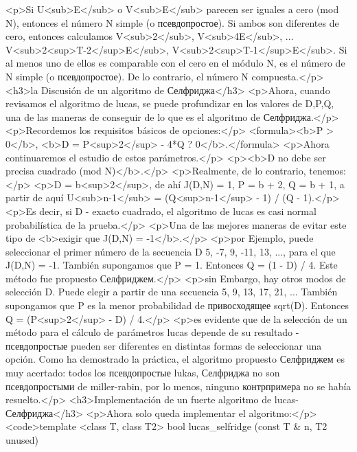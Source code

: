 <p>Si U<sub>E</sub> o V<sub>E</sub> parecen ser iguales a cero (mod N), entonces el número N simple (o псевдопростое). Si ambos son diferentes de cero, entonces calculamos V<sub>2</sub>, V<sub>4E</sub>, ... V<sub>2<sup>T-2</sup>E</sub>, V<sub>2<sup>T-1</sup>E</sub>. Si al menos uno de ellos es comparable con el cero en el módulo N, es el número de N simple (o псевдопростое). De lo contrario, el número N compuesta.</p>
<h3>la Discusión de un algoritmo de Селфриджа</h3>
<p>Ahora, cuando revisamos el algoritmo de lucas, se puede profundizar en los valores de D,P,Q, una de las maneras de conseguir de lo que es el algoritmo de Селфриджа.</p>
<p>Recordemos los requisitos básicos de opciones:</p>
<formula><b>P > 0</b>,
<b>D = P<sup>2</sup> - 4*Q ? 0</b>.</formula>
<p>Ahora continuaremos el estudio de estos parámetros.</p>
<p><b>D no debe ser precisa cuadrado (mod N)</b>.</p>
<p>Realmente, de lo contrario, tenemos:</p>
<p>D = b<sup>2</sup>, de ahí J(D,N) = 1, P = b + 2, Q = b + 1, a partir de aquí U<sub>n-1</sub> = (Q<sup>n-1</sup> - 1) / (Q - 1).</p>
<p>Es decir, si D - exacto cuadrado, el algoritmo de lucas es casi normal probabilística de la prueba.</p>
<p>Una de las mejores maneras de evitar este tipo de <b>exigir que J(D,N) = -1</b>.</p>
<p>por Ejemplo, puede seleccionar el primer número de la secuencia D 5, -7, 9, -11, 13, ..., para el que J(D,N) = -1. También supongamos que P = 1. Entonces Q = (1 - D) / 4. Este método fue propuesto Селфриджем.</p>
<p>sin Embargo, hay otros modos de selección D. Puede elegir a partir de una secuencia 5, 9, 13, 17, 21, ... También supongamos que P es la menor probabilidad de привосходящее sqrt(D). Entonces Q = (P<sup>2</sup> - D) / 4.</p>
<p>es evidente que de la selección de un método para el cálculo de parámetros lucas depende de su resultado - псевдопростые pueden ser diferentes en distintas formas de seleccionar una opción. Como ha demostrado la práctica, el algoritmo propuesto Селфриджем es muy acertado: todos los псевдопростые lukas, Селфриджа no son псевдопростыми de miller-rabin, por lo menos, ninguno контрпримера no se había resuelto.</p>
<h3>Implementación de un fuerte algoritmo de lucas-Селфриджа</h3>
<p>Ahora solo queda implementar el algoritmo:</p>
<code>template <class T, class T2>
bool lucas_selfridge (const T & n, T2 unused)
